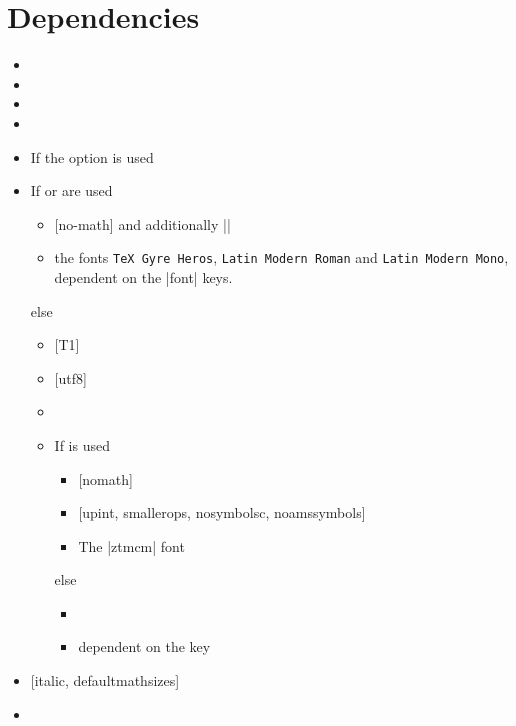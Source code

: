 \section{Dependencies}
\begin{multicols}{2}%
  \begin{itemize}[leftmargin=10pt]
    \item {}
    \item {}
    \item {}
    \item {}
    \item If the  option is used 
    \item If  or  are used
      \begin{itemize}[topsep=0pt]
        \item {} [no-math] and additionally
          \bverb||
        \item the fonts \texttt{TeX Gyre Heros}, \texttt{Latin Mod\-ern Roman}
          and \texttt{Latin Modern Mono}, dependent on the |font| keys.
      \end{itemize}
      else
      \begin{itemize}[topsep=0pt]
        \item {} [T1]
        \item {} [utf8]
        \item {}
        \item If  is used
          \begin{itemize}[topsep=0pt]
            \item {} [nomath]
            \item {} [upint, smallerops, nosymbolsc, noamssymbols]
            \item The |ztmcm| font
          \end{itemize}
          else
          \begin{itemize}[topsep=0pt]
            \item {}
            \item {} dependent on the  key
          \end{itemize}
      \end{itemize}
    \item {} [italic, defaultmathsizes]
    \item {}
  \end{itemize}
\end{multicols}%

